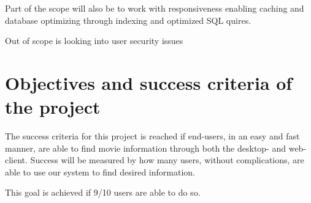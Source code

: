 Part of the scope will also be to work with responsiveness enabling caching and database optimizing through indexing and optimized SQL quires.

Out of scope is looking into user security issues


\section{Objectives and success criteria of the project}


The success criteria for this project is reached if end-users, in an easy and fast manner, are able to find movie information through both the desktop- and web-client. Success will be measured by how many users, without complications, are able to use our system to find desired information.

This goal is achieved if 9/10 users are able to do so.


